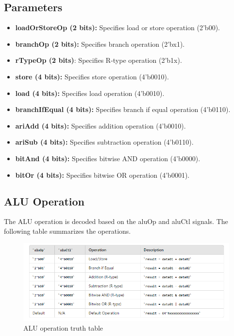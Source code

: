 \subsection{Parameters}
\begin{itemize}
    \item \textbf{loadOrStoreOp (2 bits):} Specifies load or store operation (2'b00).
    \item \textbf{branchOp (2 bits):} Specifies branch operation (2'bx1).
    \item \textbf{rTypeOp (2 bits)}: Specifies R-type operation (2'b1x).
    \item \textbf{store (4 bits): }Specifies store operation (4'b0010).
    \item \textbf{load (4 bits):} Specifies load operation (4'b0010).
    \item \textbf{branchIfEqual (4 bits):} Specifies branch if equal operation (4'b0110).
    \item \textbf{ariAdd (4 bits):} Specifies addition operation (4'b0010).
    \item \textbf{ariSub (4 bits):} Specifies subtraction operation (4'b0110).
    \item \textbf{bitAnd (4 bits):} Specifies bitwise AND operation (4'b0000).
    \item \textbf{bitOr (4 bits):} Specifies bitwise OR operation (4'b0001).
\end{itemize}

\subsection{ ALU Operation}
The ALU operation is decoded based on the aluOp and aluCtl signals. The following table summarizes the operations.



\begin{figure}[H]
    \centering
    \includegraphics[width=0.5\linewidth]{Image/Alu truth table.png}
    \caption{ALU operation truth table}
    \label{fig:ALU operation truth table}
\end{figure}


